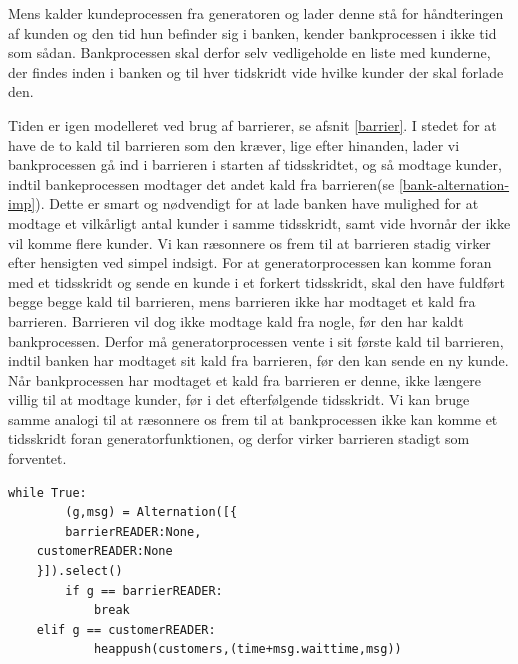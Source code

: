 Mens \simpy kalder kundeprocessen fra generatoren og lader denne stå for håndteringen af kunden 
og den tid hun befinder sig i banken, kender bankprocessen i \pycsp ikke tid som 
sådan. Bankprocessen skal derfor selv vedligeholde en liste med kunderne, der findes inden i banken og til hver 
tidskridt vide hvilke kunder der skal forlade den. 

Tiden er igen modelleret ved brug af barrierer, se afsnit \cref{barrier}. I 
stedet for at have de to kald til barrieren som den kræver, lige efter hinanden, lader 
vi bankprocessen gå ind i barrieren i starten af tidsskridtet, og så modtage 
kunder, indtil bankeprocessen modtager det andet kald fra barrieren(se \cref{bank-alternation-imp}). 
Dette er smart og nødvendigt for at lade banken have mulighed for 
at modtage et vilkårligt antal kunder i samme tidsskridt, samt vide hvornår der 
ikke vil komme flere kunder.  
Vi kan ræsonnere os frem til at barrieren stadig virker efter hensigten ved  simpel indsigt.
For at generatorprocessen kan komme foran med et tidsskridt og sende en kunde i et forkert tidsskridt,
skal den have fuldført begge begge kald til barrieren, mens barrieren ikke har modtaget et kald fra barrieren. Barrieren vil dog ikke modtage kald fra nogle, før den har  kaldt bankprocessen. Derfor må generatorprocessen vente i sit første kald til barrieren, indtil banken har modtaget 
sit kald fra barrieren, før den kan sende en ny kunde.
Når bankprocessen har modtaget et kald fra barrieren 
er denne, ikke længere villig til at modtage kunder,  før i det efterfølgende 
tidsskridt. Vi kan bruge samme analogi til at 
ræsonnere os frem til at bankprocessen ikke kan komme et tidsskridt foran 
generatorfunktionen, og derfor virker barrieren stadigt som forventet. 

\begin{lstlisting}[float=hbtp,label=bank-alternation-imp,caption=Modtage en kunde eller 
	barrier i Bankprocessen]
while True:
		(g,msg) = Alternation([{
		barrierREADER:None,
    customerREADER:None
    }]).select()
		if g == barrierREADER:
			break
    elif g == customerREADER:
			heappush(customers,(time+msg.waittime,msg))
\end{lstlisting}


